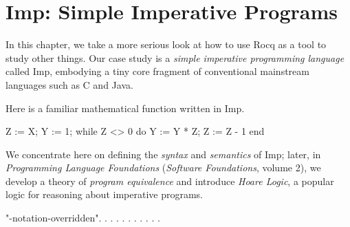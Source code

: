 \documentclass[12pt]{report}
\begin{document}

\begin{coqdoccode}
\end{coqdoccode}
\section{Imp: Simple Imperative Programs}



 In this chapter, we take a more serious look at how to use Rocq as
    a tool to study other things.  Our case study is a \textit{simple
    imperative programming language} called Imp, embodying a tiny core
    fragment of conventional mainstream languages such as C and Java.


    Here is a familiar mathematical function written in Imp.


       Z := X;
       Y := 1;
       while Z <> 0 do
         Y := Y * Z;
         Z := Z - 1
       end


 We concentrate here on defining the \textit{syntax} and \textit{semantics} of
    Imp; later, in \textit{Programming Language Foundations} (\textit{Software
    Foundations}, volume 2), we develop a theory of \textit{program
    equivalence} and introduce \textit{Hoare Logic}, a popular logic for
    reasoning about imperative programs. 
\begin{coqdoccode}
\coqdocemptyline
\coqdocnoindent
{}  "-notation-overridden".\coqdoceol
\coqdocnoindent
{}    .\coqdoceol
\coqdocnoindent
{}    .\coqdoceol
\coqdocnoindent
{}    .\coqdoceol
\coqdocnoindent
{}    .  .\coqdoceol
\coqdocnoindent
{}    .\coqdoceol
\coqdocnoindent
{}    .  .\coqdoceol
\coqdocnoindent
{}    .\coqdoceol
\coqdocnoindent
{}    .\coqdoceol
\coqdocemptyline
\end{coqdoccode}
\end{document}
